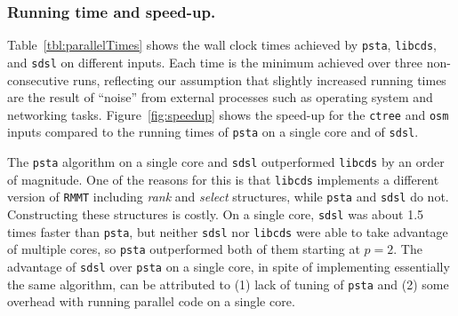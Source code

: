 \subsubsection{Running time and speed-up.}

Table~\ref{tbl:parallelTimes} shows the wall clock times achieved by
{\tt psta}, {\tt libcds}, and {\tt sdsl} on different inputs.
Each time is the minimum achieved over three non-consecutive runs, reflecting
our assumption that slightly increased running times are the result of
``noise'' from external processes such as operating system and networking tasks.
Figure~\ref{fig:speedup} shows the speed-up for the {\tt ctree} and {\tt osm}
inputs compared to the running times of {\tt psta} on a single core and
of {\tt sdsl}.

The {\tt psta} algorithm on a single core and {\tt sdsl} outperformed
{\tt libcds} by an order of magnitude.  One of the reasons for this is
that {\tt libcds} implements a different version of {\tt RMMT}
including {\em rank} and {\em select} structures, while {\tt psta} and
{\tt sdsl} do not.  Constructing these structures is costly.  On a
single core, {\tt sdsl} was about 1.5 times faster than {\tt psta},
but neither {\tt sdsl} nor {\tt libcds} were able to take advantage of
multiple cores, so {\tt psta} outperformed both of them starting at
$p = 2$.  The advantage of {\tt sdsl} over {\tt psta} on a single
core, in spite of implementing essentially the same algorithm, can be
attributed to (1) lack of tuning of {\tt psta} and (2) some overhead
with running parallel code on a single core.

